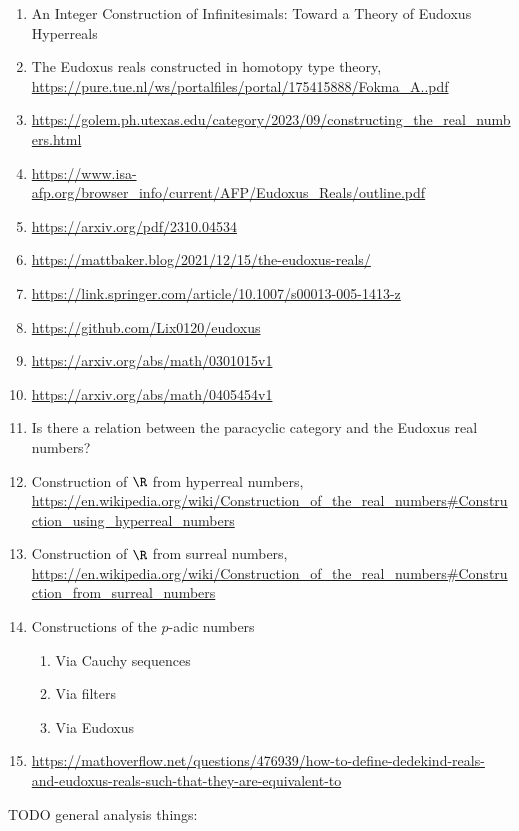 \begin{enumerate}
    \item An Integer Construction of Infinitesimals: Toward a Theory of Eudoxus Hyperreals
    \item The Eudoxus reals constructed in homotopy type theory, \url{https://pure.tue.nl/ws/portalfiles/portal/175415888/Fokma_A..pdf}
    \item \url{https://golem.ph.utexas.edu/category/2023/09/constructing_the_real_numbers.html}
    \item \url{https://www.isa-afp.org/browser_info/current/AFP/Eudoxus_Reals/outline.pdf}
    \item \url{https://arxiv.org/pdf/2310.04534}
    \item \url{https://mattbaker.blog/2021/12/15/the-eudoxus-reals/}
    \item \url{https://link.springer.com/article/10.1007/s00013-005-1413-z}
    \item \url{https://github.com/Lix0120/eudoxus}
    \item \url{https://arxiv.org/abs/math/0301015v1}
    \item \url{https://arxiv.org/abs/math/0405454v1}
    \item Is there a relation between the paracyclic category and the Eudoxus real numbers?
    \item Construction of $\R$ from hyperreal numbers, \url{https://en.wikipedia.org/wiki/Construction_of_the_real_numbers#Construction_using_hyperreal_numbers}
    \item Construction of $\R$ from surreal numbers, \url{https://en.wikipedia.org/wiki/Construction_of_the_real_numbers#Construction_from_surreal_numbers}
    \item Constructions of the $p$-adic numbers
        \begin{enumerate}
            \item Via Cauchy sequences
            \item Via filters
            \item Via Eudoxus
        \end{enumerate}
    \item \url{https://mathoverflow.net/questions/476939/how-to-define-dedekind-reals-and-eudoxus-reals-such-that-they-are-equivalent-to}
\end{enumerate}
TODO general analysis things:
